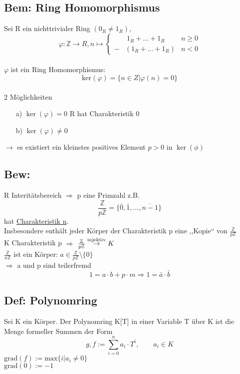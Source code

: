 \documentclass[titlepage,12pt,a4paper,ngerman]{report}
\newcommand{\tx}[1]{\textrm{#1}}
\newcommand{\grad}{\tx{grad}}
\begin{document}
\subsection{Bem: Ring Homomorphismus}  Sei R ein nichttrivialer Ring $(0_{R} \neq 1_{R})$,
$$\varphi: \mathbb{Z} \to R , n \mapsto \left\{\begin{array}{lll} & \ 1_{R}+\dots + 1_{R} & n\ge 0\\ - & ( 1_{R}+\dots + 1_{R}) & n < 0 \end{array}\right.$$\\
$\varphi$ ist ein Ring Homomorphismus:
$$\tx{ker}(\varphi) = \{n\in Z | \varphi(n) = 0\}$$\\
2 Möglichkeiten
\begin{itemize}
	\item[a)] $\ker(\varphi) = {0}$
	R hat Charakteristik 0
	\item[b)] $\ker(\varphi) \neq {0}$
\end{itemize}

$\rightarrow$ es existiert ein kleinstes positives Element $p>0$ in  $\ker(\phi)$%
\subsection{Bew:} 
R Interitätsbereich $\Rightarrow$ p eine Primzahl z.B. 
\begin{equation*} \frac{\mathbb{Z}}{p\mathbb{Z}} = \{\bar{0}, \bar{1},\dots,\overline{n-1}\} \end{equation*}
hat \underline{Charakteristik n}.\\
Insbesondere enthält jeder Körper der Charakteristik p eine ,,Kopie`` von $\frac{\mathbb{Z}}{p\mathbb{Z}}$\\
K Charakteristik p $\Rightarrow$ $\frac{\mathbb{Z}}{p\mathbb{Z}} \buildrel \tx{injektiv} \over \rightarrow K$\\
$\frac{\mathbb{Z}}{n\mathbb{Z}}$ ist ein Körper:
$a \in \frac{\mathbb{Z}}{p\mathbb{Z}}\setminus \{0\}$\\
$\Rightarrow$ a und p sind teilerfremd\\
$$ 1 = a\cdot b+p\cdot m \Rightarrow 1 = \bar{a} \cdot  \bar{b}$$
\subsection{Def: Polynomring} Sei K ein Körper. Der Polynomring K[T] in einer Variable T über K ist die Menge formeller Summen der Form $$ g,f := \sum^{n}_{i=0} a_{i} \cdot T^{i}, \qquad a_i\in K $$
$\grad(f) := \textrm{max}\{i\vert a_{i} \neq 0 \}$ \\
$ \grad(0) := -1$
\end{document}
